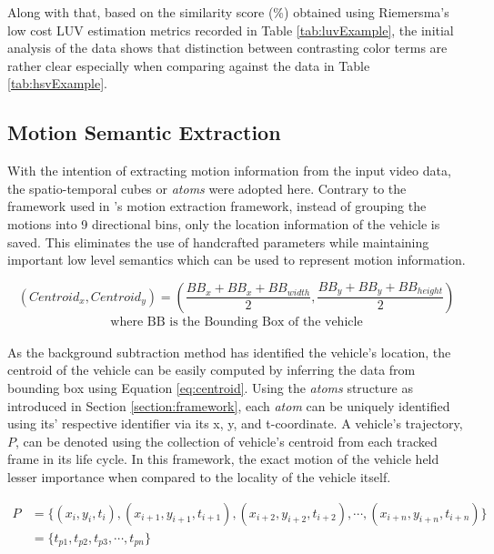 Along with that, based on the similarity score (\%) obtained using Riemersma's low cost LUV estimation metrics recorded in Table \ref{tab:luvExample}, the initial analysis of the data shows that distinction between contrasting color terms are rather clear especially when comparing against the data in Table \ref{tab:hsvExample}. 



\subsection{Motion Semantic Extraction}

With the intention of extracting motion information from the input video data, the spatio-temporal cubes or \emph{atoms} were adopted here. Contrary to the framework used in \versionOneExt's motion extraction framework, instead of grouping the motions into 9 directional bins, only the location information of the vehicle is saved. This eliminates the use of handcrafted parameters while maintaining important low level semantics which can be used to represent motion information.


\begin{equation}
\label{eq:centroid}
(Centroid_x, Centroid_y) = (\frac{BB_{x}+BB_{x}+BB_{width}}{2} , \frac{BB_{y}+BB_{y}+BB_{height}}{2})
\end{equation}
\vspace{-2em}
\begin{align*}
    \text{where BB is the Bounding Box of the vehicle}
\end{align*}

As the background subtraction method has identified the vehicle's location, the centroid of the vehicle can be easily computed by inferring the data from bounding box using Equation \ref{eq:centroid}. Using the \emph{atoms} structure as introduced in Section \ref{section:framework}, each \emph{atom} can be uniquely identified using its' respective identifier via its x, y, and t-coordinate. A vehicle's trajectory, $P$, can be denoted using the collection of  vehicle's centroid from each tracked frame in its life cycle. In this framework, the exact motion of the vehicle held lesser importance when compared to the locality of the vehicle itself. 

\begin{align}
    P &= \{ (x_i, y_i, t_i), (x_{i+1}, y_{i+1}, t_{i+1}), (x_{i+2}, y_{i+2}, t_{i+2}), \dotsb,(x_{i+n}, y_{i+n}, t_{i+n})\}  \nonumber \\
      &= \{ t_{p1}, t_{p2}, t_{p3}, \dotsb, t_{pn}\}
\end{align}


